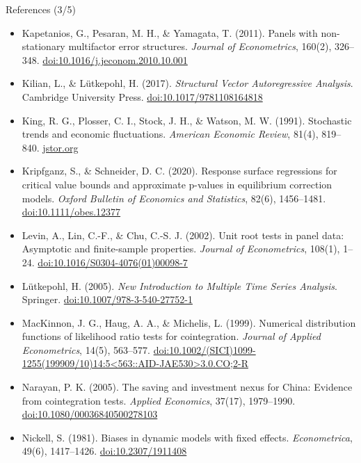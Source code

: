 \begin{frame}{References (3/5)}
\itemsize{\tiny}
\begin{itemize}
    \item Kapetanios, G., Pesaran, M. H., \& Yamagata, T. (2011). Panels with non-stationary multifactor error structures. \textit{Journal of Econometrics}, 160(2), 326--348. \href{https://doi.org/10.1016/j.jeconom.2010.10.001}{doi:10.1016/j.jeconom.2010.10.001}
    \item Kilian, L., \& Lütkepohl, H. (2017). \textit{Structural Vector Autoregressive Analysis}. Cambridge University Press. \href{https://doi.org/10.1017/9781108164818}{doi:10.1017/9781108164818}
    \item King, R. G., Plosser, C. I., Stock, J. H., \& Watson, M. W. (1991). Stochastic trends and economic fluctuations. \textit{American Economic Review}, 81(4), 819--840. \href{https://www.jstor.org/stable/2006644}{jstor.org}
    \item Kripfganz, S., \& Schneider, D. C. (2020). Response surface regressions for critical value bounds and approximate p-values in equilibrium correction models. \textit{Oxford Bulletin of Economics and Statistics}, 82(6), 1456--1481. \href{https://doi.org/10.1111/obes.12377}{doi:10.1111/obes.12377}
    \item Levin, A., Lin, C.-F., \& Chu, C.-S. J. (2002). Unit root tests in panel data: Asymptotic and finite-sample properties. \textit{Journal of Econometrics}, 108(1), 1--24. \href{https://doi.org/10.1016/S0304-4076(01)00098-7}{doi:10.1016/S0304-4076(01)00098-7}
    \item Lütkepohl, H. (2005). \textit{New Introduction to Multiple Time Series Analysis}. Springer. \href{https://doi.org/10.1007/978-3-540-27752-1}{doi:10.1007/978-3-540-27752-1}
    \item MacKinnon, J. G., Haug, A. A., \& Michelis, L. (1999). Numerical distribution functions of likelihood ratio tests for cointegration. \textit{Journal of Applied Econometrics}, 14(5), 563--577. \href{https://doi.org/10.1002/(SICI)1099-1255(199909/10)14:5\%3C563::AID-JAE530\%3E3.0.CO\%3B2-R}{doi:10.1002/(SICI)1099-1255(199909/10)14:5\textless{}563::AID-JAE530\textgreater{}3.0.CO;2-R}
    \item Narayan, P. K. (2005). The saving and investment nexus for China: Evidence from cointegration tests. \textit{Applied Economics}, 37(17), 1979--1990. \href{https://doi.org/10.1080/00036840500278103}{doi:10.1080/00036840500278103}
    \item Nickell, S. (1981). Biases in dynamic models with fixed effects. \textit{Econometrica}, 49(6), 1417--1426. \href{https://doi.org/10.2307/1911408}{doi:10.2307/1911408}

\end{itemize}
\end{frame}
